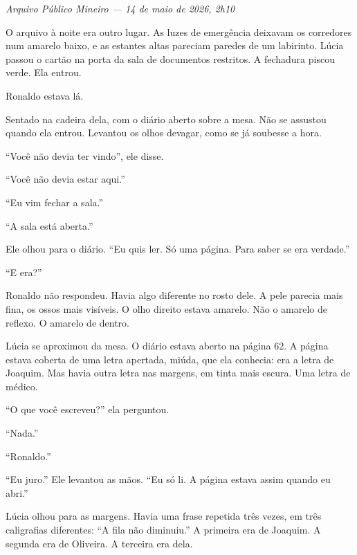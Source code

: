 
\noindent \textit{Arquivo Público Mineiro --- 14 de maio de 2026, 2h10}

\noindent O arquivo à noite era outro lugar. As luzes de emergência deixavam os corredores num amarelo baixo, e as estantes altas pareciam paredes de um labirinto. Lúcia passou o cartão na porta da sala de documentos restritos. A fechadura piscou verde. Ela entrou.

\noindent Ronaldo estava lá.

\noindent Sentado na cadeira dela, com o diário aberto sobre a mesa. Não se assustou quando ela entrou. Levantou os olhos devagar, como se já soubesse a hora.

\noindent ``Você não devia ter vindo'', ele disse.

\noindent ``Você não devia estar aqui.''

\noindent ``Eu vim fechar a sala.''

\noindent ``A sala está aberta.''

\noindent Ele olhou para o diário. ``Eu quis ler. Só uma página. Para saber se era verdade.''

\noindent ``E era?''

\noindent Ronaldo não respondeu. Havia algo diferente no rosto dele. A pele parecia mais fina, os ossos mais visíveis. O olho direito estava amarelo. Não o amarelo de reflexo. O amarelo de dentro.

\noindent Lúcia se aproximou da mesa. O diário estava aberto na página 62. A página estava coberta de uma letra apertada, miúda, que ela conhecia: era a letra de Joaquim. Mas havia outra letra nas margens, em tinta mais escura. Uma letra de médico.

\noindent ``O que você escreveu?'' ela perguntou.

\noindent ``Nada.''

\noindent ``Ronaldo.''

\noindent ``Eu juro.'' Ele levantou as mãos. ``Eu só li. A página estava assim quando eu abri.''

\noindent Lúcia olhou para as margens. Havia uma frase repetida três vezes, em três caligrafias diferentes: ``A fila não diminuiu.'' A primeira era de Joaquim. A segunda era de Oliveira. A terceira era dela.

